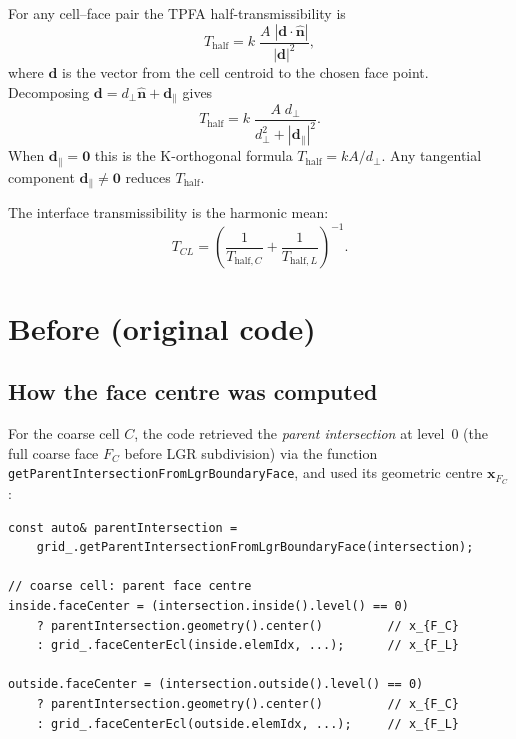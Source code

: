 \documentclass[11pt,a4paper]{article}
\begin{document}
For any cell--face pair the TPFA half-transmissibility is
\begin{equation}
  T_\mathrm{half}
    = k\;\frac{A\;|\mathbf{d}\cdot\hat{\mathbf{n}}|}{|\mathbf{d}|^{2}},
  \label{eq:halftrans}
\end{equation}
where $\mathbf{d}$ is the vector from the cell centroid to the chosen
face point. Decomposing $\mathbf{d} = d_\perp\hat{\mathbf{n}} +
\mathbf{d}_\parallel$ gives
\begin{equation}
  T_\mathrm{half}
    = k\;\frac{A\;d_\perp}{d_\perp^{2} + |\mathbf{d}_\parallel|^{2}}.
\end{equation}
When $\mathbf{d}_\parallel = \mathbf{0}$ this is the K-orthogonal
formula $T_\mathrm{half} = kA/d_\perp$.  Any tangential component
$\mathbf{d}_\parallel \neq \mathbf{0}$ reduces $T_\mathrm{half}$.

The interface transmissibility is the harmonic mean:
\begin{equation}
  T_{CL} =
  \left(\frac{1}{T_{\mathrm{half},C}}+
        \frac{1}{T_{\mathrm{half},L}}\right)^{-1}.
\end{equation}

\section*{Before (original code)}

\subsection*{How the face centre was computed}

For the coarse cell $C$, the code retrieved the \emph{parent intersection}
at level~0 (the full coarse face $F_C$ before LGR subdivision) via the
function \texttt{getParentIntersectionFromLgrBoundaryFace}, and used its
geometric centre $\mathbf{x}_{F_C}$:

\begin{lstlisting}
const auto& parentIntersection =
    grid_.getParentIntersectionFromLgrBoundaryFace(intersection);

// coarse cell: parent face centre
inside.faceCenter = (intersection.inside().level() == 0)
    ? parentIntersection.geometry().center()         // x_{F_C}
    : grid_.faceCenterEcl(inside.elemIdx, ...);      // x_{F_L}

outside.faceCenter = (intersection.outside().level() == 0)
    ? parentIntersection.geometry().center()         // x_{F_C}
    : grid_.faceCenterEcl(outside.elemIdx, ...);     // x_{F_L}
\end{lstlisting}
\end{document}
